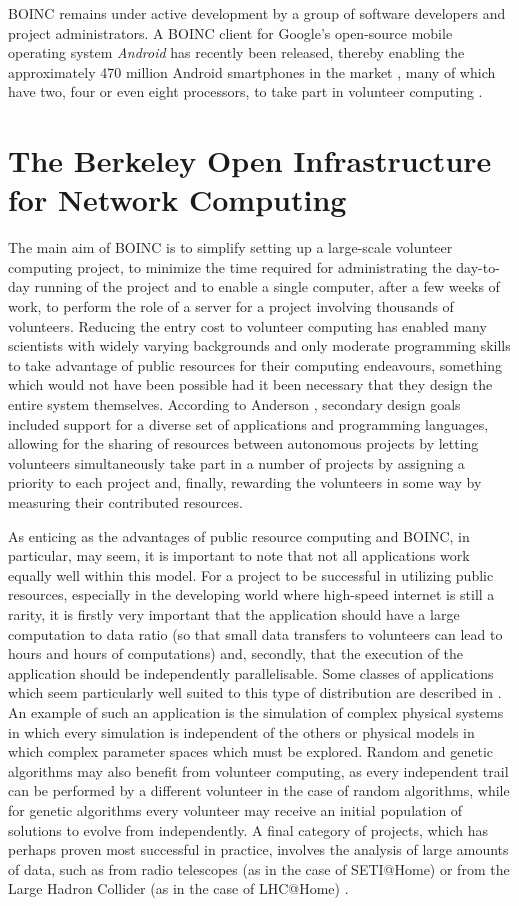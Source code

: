 BOINC remains under active development by a group of software developers and project administrators. A BOINC client for Google's open-source mobile operating system \emph{Android} has recently been released, thereby enabling the approximately 470 million Android smartphones in the market \cite{mobithinking}, many of which have two, four or even eight processors,      to take part in volunteer computing \cite{android}.

\section{The Berkeley Open Infrastructure for Network Computing} \label{Boincgen}
The main aim of BOINC is to simplify setting up a large-scale volunteer computing project, to minimize the time required for administrating the day-to-day running of the project and to enable a single computer, after a few weeks of work, to perform the role of a server for a project involving thousands of volunteers. Reducing the entry cost to volunteer computing has enabled many scientists with widely varying backgrounds and only moderate programming skills to take advantage of public resources for their computing endeavours, something which would not have been possible had it been necessary that they design the entire system themselves. According to Anderson \cite{anderson2004boinc},  secondary design goals included support for a diverse set of applications and programming languages, allowing for the sharing of resources between autonomous projects by letting volunteers simultaneously take part in a number of projects by assigning a priority to each project   and, finally, rewarding the volunteers in some way by measuring their  contributed resources.

As enticing as  the advantages of public resource computing and BOINC, in particular, may seem, it is important to note that not all applications   work equally well within this model. For a project to be successful in  utilizing public resources, especially in the developing world where high-speed internet is still a rarity,  it is firstly  very important that the application  should have a large computation to data ratio (so that small data transfers to volunteers can lead to hours and hours of computations) and, secondly, that the execution of the application should be independently parallelisable. Some classes of applications which seem particularly well suited to this type of distribution are described in \cite{anderson:pc}. An example of such an application is the simulation of complex physical systems  in which every simulation is independent of the others  or physical models in which complex parameter spaces which must be explored. Random and genetic algorithms may also benefit from volunteer computing, as every independent trail can be performed by a different volunteer in the case of random algorithms, while for genetic algorithms every volunteer may receive an initial population of solutions to  evolve from independently. A final category of projects, which has perhaps proven most successful in practice, involves the analysis of large amounts of data, such as from radio telescopes (as in the case of SETI@Home) or  from the Large Hadron Collider (as in the case of LHC@Home) \cite{anderson:pc}.

